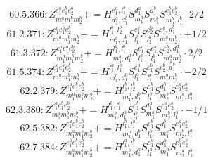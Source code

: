 \documentclass[letterpaper,10pt,fleqn,leqno,onecolumn]{article}
\begin{document}
\begin{equation} \;\;\;\;\;\;  60.5.366: Z^{e_{1}^{a}e_{1}^{b}e_{2}^{b}}_{m_{1}^{a}m_{1}^{b}m_{2}^{b}}+=H^{e_{1}^{a},l_{1}^{b}}_{d_{1}^{a},d_{1}^{b}}S^{d_{1}^{a}}_{m_{1}^{a}}S^{d_{1}^{b}}_{m_{1}^{b}}S^{e_{1}^{b}e_{2}^{b}}_{m_{2}^{b},l_{1}^{b}}\cdot 2/2 \end{equation}
\begin{equation} \;\;\;\;\;\;  61.2.371: Z^{e_{1}^{a}e_{1}^{b}e_{2}^{b}}_{m_{1}^{a}m_{1}^{b}m_{2}^{b}}+=H^{l_{1}^{b},l_{2}^{b}}_{m_{1}^{b},d_{1}^{b}}S^{e_{1}^{b}}_{l_{1}^{b}}S^{e_{2}^{b}}_{l_{2}^{b}}S^{e_{1}^{a},d_{1}^{b}}_{m_{1}^{a}m_{2}^{b}}\cdot +1/2 \end{equation}
\begin{equation} \;\;\;\;\;\;  61.3.372: Z^{e_{1}^{a}e_{1}^{b}e_{2}^{b}}_{m_{1}^{a}m_{1}^{b}m_{2}^{b}}+=H^{l_{1}^{a},l_{1}^{b}}_{m_{1}^{b},d_{1}^{a}}S^{e_{1}^{a}}_{l_{1}^{a}}S^{e_{1}^{b}}_{l_{1}^{b}}S^{e_{2}^{b},d_{1}^{a}}_{m_{1}^{a}m_{2}^{b}}\cdot 2/2 \end{equation}
\begin{equation} \;\;\;\;\;\;  61.5.374: Z^{e_{1}^{a}e_{1}^{b}e_{2}^{b}}_{m_{1}^{a}m_{1}^{b}m_{2}^{b}}+=H^{l_{1}^{a},l_{1}^{b}}_{m_{1}^{a},d_{1}^{b}}S^{e_{1}^{a}}_{l_{1}^{a}}S^{e_{1}^{b}}_{l_{1}^{b}}S^{e_{2}^{b},d_{1}^{b}}_{m_{1}^{b}m_{2}^{b}}\cdot -2/2 \end{equation}
\begin{equation} \;\;\;\;\;\;  62.2.379: Z^{e_{1}^{a}e_{1}^{b}e_{2}^{b}}_{m_{1}^{a}m_{1}^{b}m_{2}^{b}}+=H^{l_{1}^{b},l_{2}^{b}}_{m_{1}^{b},d_{1}^{b}}S^{e_{1}^{b}}_{l_{1}^{b}}S^{d_{1}^{b}}_{m_{2}^{b}}S^{e_{1}^{a}e_{2}^{b}}_{m_{1}^{a},l_{2}^{b}} \end{equation}
\begin{equation} \;\;\;\;\;\;  62.3.380: Z^{e_{1}^{a}e_{1}^{b}e_{2}^{b}}_{m_{1}^{a}m_{1}^{b}m_{2}^{b}}+=H^{l_{1}^{b},l_{1}^{a}}_{m_{1}^{b},d_{1}^{a}}S^{e_{1}^{b}}_{l_{1}^{b}}S^{d_{1}^{a}}_{m_{1}^{a}}S^{e_{1}^{a}e_{2}^{b}}_{m_{2}^{b},l_{1}^{a}}\cdot -1/1 \end{equation}
\begin{equation} \;\;\;\;\;\;  62.5.382: Z^{e_{1}^{a}e_{1}^{b}e_{2}^{b}}_{m_{1}^{a}m_{1}^{b}m_{2}^{b}}+=H^{l_{1}^{b},l_{1}^{a}}_{m_{1}^{a},d_{1}^{b}}S^{e_{1}^{b}}_{l_{1}^{b}}S^{d_{1}^{b}}_{m_{1}^{b}}S^{e_{1}^{a}e_{2}^{b}}_{m_{2}^{b},l_{1}^{a}} \end{equation}
\begin{equation} \;\;\;\;\;\;  62.7.384: Z^{e_{1}^{a}e_{1}^{b}e_{2}^{b}}_{m_{1}^{a}m_{1}^{b}m_{2}^{b}}+=H^{l_{1}^{a},l_{1}^{b}}_{m_{1}^{b},d_{1}^{a}}S^{e_{1}^{a}}_{l_{1}^{a}}S^{d_{1}^{a}}_{m_{1}^{a}}S^{e_{1}^{b}e_{2}^{b}}_{m_{2}^{b},l_{1}^{b}} \end{equation}
\end{document}
